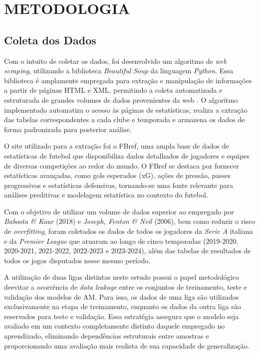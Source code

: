 \chapter{METODOLOGIA}

\section{Coleta dos Dados}

Com o intuito de coletar os dados, foi desenvolvido um algoritmo de \textit{web scraping}, utilizando a biblioteca \textit{Beautiful Soup} da linguagem \textit{Python}. 
Essa biblioteca é amplamente empregada para extração e manipulação de informações a partir de páginas HTML e XML, permitindo a coleta automatizada e estruturada de grandes 
volumes de dados provenientes da web \cite{beautifulsoup}. O algoritmo implementado automatiza o acesso às páginas de estatísticas, realiza a extração das tabelas 
correspondentes a cada clube e temporada e armazena os dados de forma padronizada para posterior análise.

O site utilizado para a extração foi o FBref, uma ampla base de dados de estatísticas de futebol que disponibiliza dados detalhados de jogadores e equipes de diversas 
competições ao redor do mundo. O FBref se destaca por fornecer estatísticas avançadas, como gols esperados (xG), ações de pressão, passes progressivos e 
estatísticas defensivas, tornando-se uma fonte relevante para análises preditivas e modelagem estatística no contexto do futebol.

Com o objetivo de utilizar um volume de dados superior ao empregado por \textit{Baboota \& Kaur} (2018) e \textit{Joseph, Fenton \& Neil} (2006), bem como reduzir o 
risco de \textit{overfitting}, foram coletados os dados de todos os jogadores da \textit{Serie A} italiana e da \textit{Premier League} que atuaram ao longo de cinco 
temporadas (2019-2020, 2020-2021, 2021-2022, 2022-2023 e 2023-2024), além das tabelas de resultados de todos os jogos disputados nesse mesmo período.

A utilização de duas ligas distintas neste estudo possui o papel metodológico deevitar a ocorrência de \textit{data leakage} entre os conjuntos de 
treinamento, teste e validação dos modelos de AM. Para isso, os dados de uma liga são utilizados exclusivamente na etapa de treinamento, enquanto os 
dados da outra liga são reservados para teste e validação. Essa estratégia assegura que o modelo seja avaliado em um contexto completamente distinto daquele empregado no 
aprendizado, eliminando dependências estruturais entre amostras e proporcionando uma avaliação mais realista de sua capacidade de generalização.

